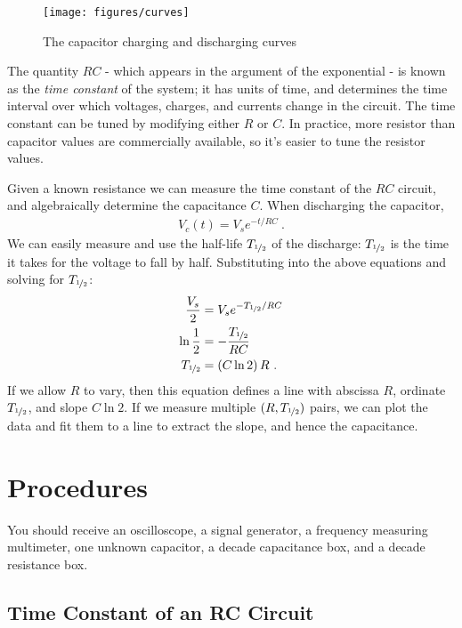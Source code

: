 \documentclass[12pt]{article}
\newcommand{\halflife}{\ensuremath{T_{\nicefrac{1}{2}}}\xspace}
\begin{document}
\begin{figure}
  \centering
  \texttt{[image: figures/curves]}
  \caption{The capacitor charging and discharging curves}
  \label{fig:curves}
\end{figure}
The quantity $RC$ - which appears in the argument of the exponential -
is known as the \textit{time constant} of the system; it has units of
time, and determines the time interval over which voltages, charges,
and currents change in the circuit.  The time constant can be tuned by
modifying either $R$ or $C$.  In practice, more resistor than
capacitor values are commercially available, so it's easier to tune
the resistor values.

Given a known resistance we can measure the time constant of the $RC$
circuit, and algebraically determine the capacitance $C$.  When
discharging the capacitor,
\begin{gather*}
  V_c(t) = V_s e^{-t/RC}\ .
\end{gather*}
We can easily measure and use the half-life \halflife of the
discharge: \halflife is the time it takes for the voltage
to fall by half.  Substituting into the above equations and solving
for \halflife:
\begin{align*}
  \frac{V_s}{2} &= V_s e^{-\halflife/RC}\\
  \ln \frac{1}{2} &= -\frac{\halflife}{RC}\\
  \halflife &= \left(C \ln 2\right) R\ .
\end{align*}
If we allow $R$ to vary, then this equation defines a line with
abscissa $R$, ordinate \halflife, and slope $C \ln 2$.  If we measure
multiple $(R, \halflife)$ pairs, we can plot the data and fit them to
a line to extract the slope, and hence the capacitance.

\section{Procedures}
\label{sec:procedures}

You should receive an oscilloscope, a signal generator, a frequency
measuring multimeter, one unknown capacitor, a decade capacitance box,
and a decade resistance box.

\subsection{Time Constant of an RC Circuit}
\label{sec:timeconst}
\end{document}
